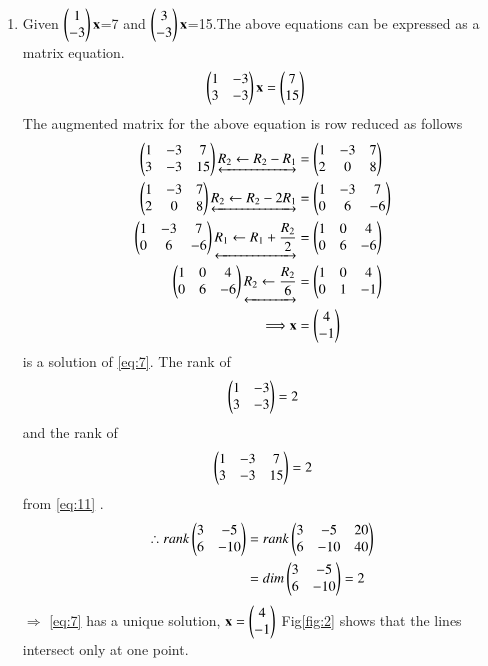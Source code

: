 \documentclass[journal,12pt,twocolumn]{IEEEtran}
\begin{document}
\begin{enumerate}
    \item Given $\begin{pmatrix}1\\-3\end{pmatrix}\mathbf{x}$=7 and $\begin{pmatrix}3\\-3\end{pmatrix}\mathbf{x}$=15.The above equations can be expressed as a matrix equation.
    \begin{align}
\label{eq:7}
  \begin{pmatrix}1&-3\\3&-3\end{pmatrix}\mathbf{x} &= \begin{pmatrix}7\\15\end{pmatrix}
\end{align}
The augmented matrix for the above equation
is row reduced as follows
\begin{align}
    \begin{pmatrix}1&-3&7\\3&-3&15\end{pmatrix}\underleftrightarrow{R_2\leftarrow R_2 -R_1}&=\begin{pmatrix}1&-3&7\\2&0&8\end{pmatrix} 
    \\ 
    \begin{pmatrix}1&-3&7\\2&0&8\end{pmatrix}\underleftrightarrow{R_2\leftarrow R_2 -2R_1}&=\begin{pmatrix}1&-3&7\\0&6&-6\end{pmatrix} 
    \\
    \begin{pmatrix}1&-3&7\\0&6&-6\end{pmatrix}\underleftrightarrow{R_1\leftarrow R_1 +\frac{R_2}{2}}&=\begin{pmatrix}1&0&4\\0&6&-6\end{pmatrix} 
\\ \begin{pmatrix}1&0&4\\0&6&-6\end{pmatrix}\underleftrightarrow{R_2\leftarrow\frac{R_2}{6}}&=\begin{pmatrix}1&0&4\\0&1&-1\end{pmatrix} \label{eq:11}
\\ \Longrightarrow \mathbf{x}&=\begin{pmatrix}4\\-1\end{pmatrix}
\end{align} is a solution of \ref{eq:7}.
The rank of
\begin{equation} 
\begin{pmatrix}1&-3\\3&-3\end{pmatrix} = 2
\end{equation}
and the rank of
\begin{equation} 
\begin{pmatrix}1&-3&7\\3&-3&15\end{pmatrix} = 2
\end{equation}from \ref{eq:11} .
\begin{align}
    \therefore rank \begin{pmatrix}3&-5\\6&-10\end{pmatrix} &= rank\begin{pmatrix}3&-5&20\\6&-10&40\end{pmatrix}\\
    &=dim\begin{pmatrix}3&-5\\6&-10\end{pmatrix}=2
\end{align}
$\Longrightarrow$ \ref{eq:7} has a unique solution, $\mathbf{x}=\begin{pmatrix}4\\-1\end{pmatrix}$
Fig\ref{fig:2} shows that the lines intersect only at one point.


\end{enumerate}
\end{document}

